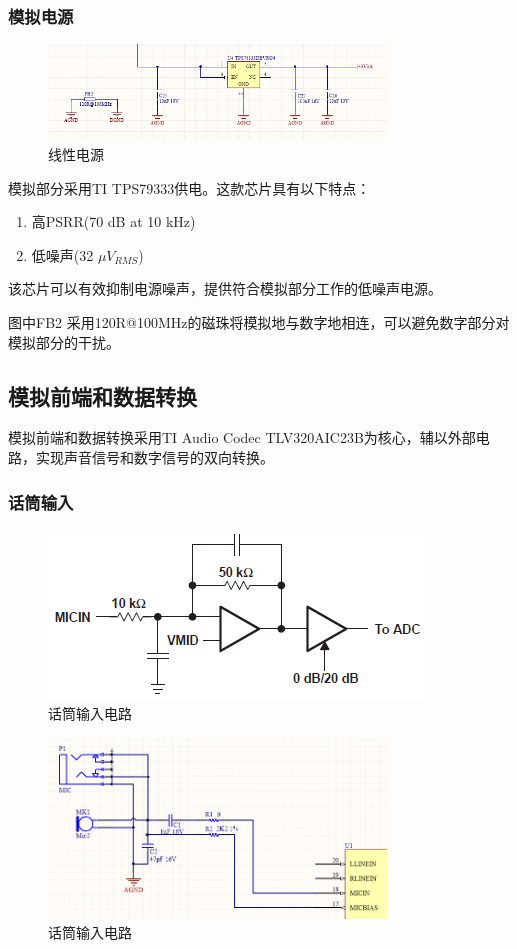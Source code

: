 \documentclass[16pt,a4paper]{article}
\begin{document}
\subsubsection{模拟电源}
\begin{figure}[H]
\centering
\includegraphics[width=0.8\textwidth]{power2.png}
\caption{线性电源} 
\end{figure}
模拟部分采用TI TPS79333供电。这款芯片具有以下特点：

\begin{enumerate}
\item 高PSRR(70 dB at 10 kHz)
\item 低噪声(32 $\mu V_{RMS}$)
\end{enumerate}\par
该芯片可以有效抑制电源噪声，提供符合模拟部分工作的低噪声电源。\par
图中FB2 采用120R@100MHz的磁珠将模拟地与数字地相连，可以避免数字部分对模拟部分的干扰。
\subsection{模拟前端和数据转换}
模拟前端和数据转换采用TI Audio Codec TLV320AIC23B为核心，辅以外部电路，实现声音信号和数字信号的双向转换。
\subsubsection{话筒输入}
\begin{figure}[H]
\centering
\includegraphics[scale = 1]{Mic1.png}
\caption{话筒输入电路} 
\end{figure}

\begin{figure}[H]
\centering
\includegraphics[width=0.8\textwidth]{Mic2.png}
\caption{话筒输入电路} 
\end{figure}
\end{document}
